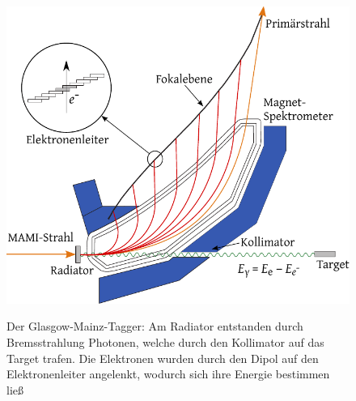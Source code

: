 \documentclass[a4paper,11pt,oneside,final,german,openbib,pdftex]{scrbook}
\begin{document}
\begin{figure}[h]
	\begin{center}
	\includegraphics{TAGGER}
	\label{fig.TAGGER}
	\caption{Der Glasgow-Mainz-Tagger: Am Radiator entstanden durch Bremsstrahlung Photonen, welche durch den Kollimator auf das Target trafen. Die Elektronen wurden durch den Dipol auf den Elektronenleiter angelenkt, wodurch sich ihre Energie bestimmen lie{\ss}\cite{Un08}}
	\end{center}
\end{figure}
 
 
\end{document}

